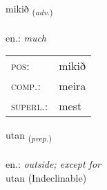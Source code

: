 \documentclass[frontgrid, backgrid]{flacards}\usepackage[]{graphicx}\usepackage[]{xcolor}
\begin{document}
\renewcommand{\flhead}{\vskip5pt \fboxsep=0pt {\small\bfseries\footnotesize Atviksorð | Adverb}}
\renewcommand{\fcfoot}{\vskip5pt \fboxsep=0pt \hspace{2pt}{\small\bfseries\footnotesize 1K}}

\renewcommand{\blhead}{\vskip5pt {\small\bfseries\footnotesize Atviksorð | Adverb }}
\renewcommand{\bcfoot}{\vskip5pt \hspace{2pt}{\small\bfseries\footnotesize 1K}}


{mikið \small{\textsubscript{(\textit{adv.})}} \\[1ex] %
\textphonetic{[mɪːcɪð]} \\
en.: \emph{much} \\  [2ex]
\renewcommand*{\arraystretch}{0.8}
\begin{tabular}{ll}
\textsc{pos}: & mikið \\ 
\textsc{comp.}: & meira \\ 
\textsc{superl.}: & mest \\
\end{tabular}
}


\renewcommand{\flhead}{\vskip5pt \fboxsep=0pt {\small\bfseries\footnotesize Forsetning | Preposition}}
\renewcommand{\fcfoot}{\vskip5pt \fboxsep=0pt \hspace{2pt}{\small\bfseries\footnotesize 1K}}

\renewcommand{\blhead}{\vskip5pt {\small\bfseries\footnotesize Forsetning | Preposition }}
\renewcommand{\bcfoot}{\vskip5pt \hspace{2pt}{\small\bfseries\footnotesize 1K}}


{utan \small{\textsubscript{(\textit{prep.})}} \\[1ex]
\textphonetic{[ʏːtan]} \\
en.: \emph{outside; except for} \\  [2ex]
utan (Indeclinable)}

\renewcommand{\flhead}{\vskip5pt \fboxsep=0pt {\small\bfseries\footnotesize Nafnorð | Noun}}
\renewcommand{\fcfoot}{\vskip5pt \fboxsep=0pt \hspace{2pt}{\small\bfseries\footnotesize 1K}}
\end{document}
